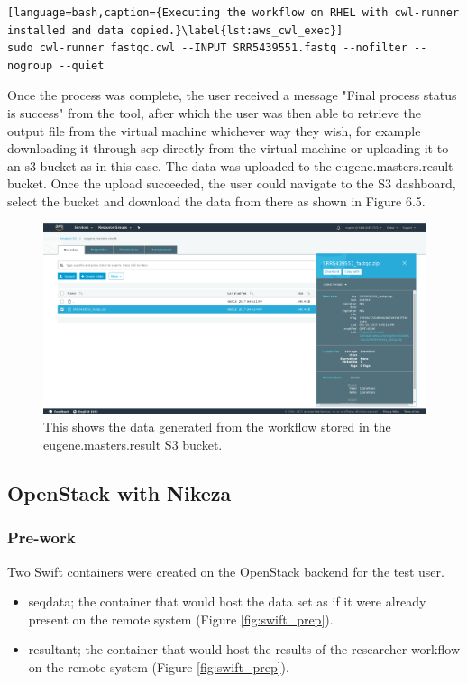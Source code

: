 \begin{lstlisting}[language=bash,caption={Executing the workflow on RHEL with cwl-runner installed and data copied.}\label{lst:aws_cwl_exec}]
sudo cwl-runner fastqc.cwl --INPUT SRR5439551.fastq --nofilter --nogroup --quiet
\end{lstlisting}

Once the process was complete, the user received a message "Final process status is success" from the tool, after which the user was then able to retrieve the output file from the virtual machine whichever way they wish, for example downloading it through scp directly from the virtual machine or uploading it to an s3 bucket as in this case. The data was uploaded to the eugene.masters.result bucket. Once the upload succeeded, the user could navigate to the S3 dashboard, select the bucket and download the data from there as shown in Figure 6.5.

\begin{figure}[h!]
\centering
\includegraphics[width=\textwidth]{Figures/4_s3_bucket_result.png}
\decoRule
\caption[AWS S3 Bucket with Result Data]{This shows the data generated from the workflow stored in the eugene.masters.result S3 bucket.}
\label{fig:aws_s3_result}
\end{figure}

\subsection{OpenStack with Nikeza}

\subsubsection{Pre-work}

Two Swift containers were created on the OpenStack backend for the test user.

\begin{itemize}
    \item seqdata; the container that would host the data set as if it were already present on the remote system (Figure \ref{fig:swift_prep}).
    \item resultant; the container that would host the results of the researcher workflow on the remote system (Figure \ref{fig:swift_prep}).
\end{itemize}

